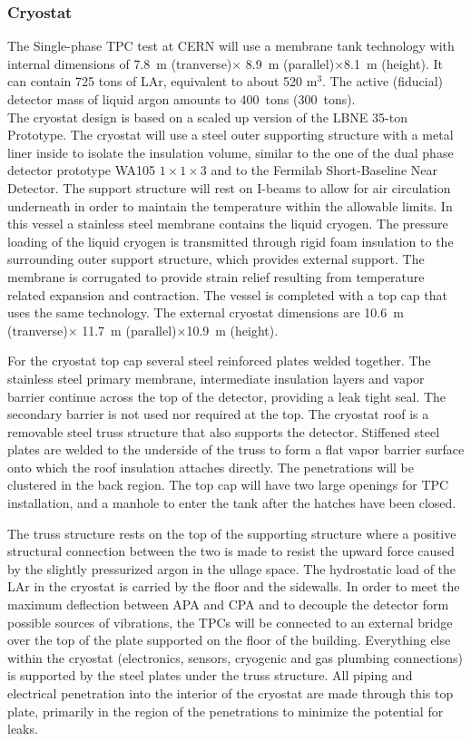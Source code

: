 \subsubsection{Cryostat}

The Single-phase TPC test at CERN will use a membrane tank technology with internal dimensions of 
7.8~m (tranverse)$\times$ 8.9~m (parallel)$\times$8.1~m (height). 
It can contain  725 tons of LAr, equivalent to about 520 m$^3$. The active (fiducial) detector mass of liquid argon amounts to 400~tons (300~tons).\\
The cryostat design is based on a scaled up version of the LBNE 35-ton Prototype\cite{montanari_35ton}. 
The cryostat will use a steel outer supporting structure with a metal liner inside to isolate the insulation volume, similar to the one of the dual phase detector prototype WA105 $1\times1\times3$ and to the Fermilab Short-Baseline Near Detector. The support structure will rest on I-beams to allow for air circulation underneath in order to maintain the temperature within the allowable limits.
In this vessel a stainless steel membrane contains the liquid cryogen. The pressure loading of the liquid cryogen is transmitted through rigid foam insulation to the surrounding outer support structure, which provides external support. The membrane is corrugated to provide strain relief resulting from temperature related expansion and contraction. The vessel is completed with a top cap that uses the same technology.
The external cryostat dimensions are 10.6~m (tranverse)$\times$ 11.7~m (parallel)$\times$10.9~m (height). 


For the cryostat top cap
several steel reinforced plates welded together. The stainless steel primary 
membrane, intermediate insulation layers and vapor barrier continue across the top of the detector, 
providing a leak tight seal. The secondary barrier is not used nor required at the top. The cryostat roof is 
a removable steel truss structure that also supports the detector. Stiffened steel plates are welded to the 
underside of the truss to form a flat vapor barrier surface onto which the roof insulation attaches directly. 
The penetrations will be clustered in the back region. The top cap will have two large openings for TPC 
installation, and a manhole to enter the tank  after the 
hatches have been closed.

The truss structure rests on the top of the supporting structure where a positive structural connection 
between the two is made to resist the upward force caused by the slightly pressurized argon in the ullage 
space. The hydrostatic load of the LAr in the cryostat is carried by the floor and the sidewalls. In order to meet the maximum deflection between APA and CPA and to decouple the detector form possible sources of vibrations, the TPCs will be connected to an external bridge over the top of the plate supported on the floor of the building. Everything else within the cryostat 
(electronics, sensors, cryogenic and gas plumbing connections) is 
supported by the steel plates under the truss structure. All piping and electrical penetration into the 
interior of the cryostat are made through this top plate, primarily in the region of the penetrations to 
minimize the potential for leaks. 

